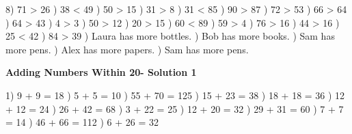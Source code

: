 \documentclass{article}%
\begin{document}
8) 71 > 26%
) 38 < 49%
) 50 > 15%
) 31 > 8%
) 31 < 85%
) 90 > 87%
) 72 > 53%
) 66 > 64%
) 64 > 43%
) 4 > 3%
) 50 > 12%
) 20 > 15%
) 60 < 89%
) 59 > 4%
) 76 > 16%
) 44 > 16%
) 25 < 42%
) 84 > 39%
) Laura has more bottles.%
) Bob has more books.%
) Sam has more pens.%
) Alex has more papers.%
) Sam has more pens.%
\newline%
\newpage%
\large%
\begin{center}%
\textbf{Adding Numbers Within 20- Solution 1}%
\newline%
\end{center} \normalsize%
1) 9 + 9 = 18%
) 5 + 5 = 10%
) 55 + 70 = 125%
) 15 + 23 = 38%
) 18 + 18 = 36%
) 12 + 12 = 24%
) 26 + 42 = 68%
) 3 + 22 = 25%
) 12 + 20 = 32%
) 29 + 31 = 60%
) 7 + 7 = 14%
) 46 + 66 = 112%
) 6 + 26 = 32%
\newline%
\end{document}
